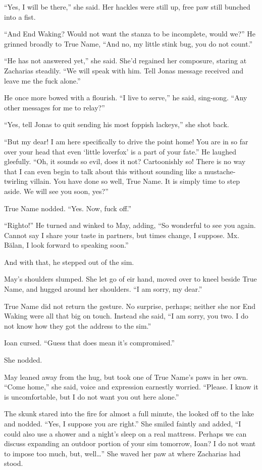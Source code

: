 ``Yes, I will be there,'' she said. Her hackles were still up, free paw still bunched into a fist.

``And End Waking? Would not want the stanza to be incomplete, would we?'' He grinned broadly to True Name, ``And no, my little stink bug, you do not count.''

``He has not answered yet,'' she said. She'd regained her composure, staring at Zacharias steadily. ``We will speak with him. Tell Jonas message received and leave me the fuck alone.''

He once more bowed with a flourish. ``I live to serve,'' he said, sing-song. ``Any other messages for me to relay?''

``Yes, tell Jonas to quit sending his most foppish lackeys,'' she shot back.

``But my dear! I am here specifically to drive the point home! You are in so far over your head that even `little loverfox' is a part of your fate.'' He laughed gleefully. ``Oh, it sounds so evil, does it not? Cartoonishly so! There is no way that I can even begin to talk about this without sounding like a mustache-twirling villain. You have done so well, True Name. It is simply time to step aside. We will see you soon, yes?''

True Name nodded. ``Yes. Now, fuck off.''

``Righto!'' He turned and winked to May, adding, ``So wonderful to see you again. Cannot say I share your taste in partners, but times change, I suppose. Mx. Bălan, I look forward to speaking soon.''

And with that, he stepped out of the sim.

May's shoulders slumped. She let go of eir hand, moved over to kneel beside True Name, and hugged around her shoulders. ``I am sorry, my dear.''

True Name did not return the gesture. No surprise, perhaps; neither she nor End Waking were all that big on touch. Instead she said, ``I am sorry, you two. I do not know how they got the address to the sim.''

Ioan cursed. ``Guess that does mean it's compromised.''

She nodded.

May leaned away from the hug, but took one of True Name's paws in her own. ``Come home,'' she said, voice and expression earnestly worried. ``Please. I know it is uncomfortable, but I do not want you out here alone.''

The skunk stared into the fire for almost a full minute, the looked off to the lake and nodded. ``Yes, I suppose you are right.'' She smiled faintly and added, ``I could also use a shower and a night's sleep on a real mattress. Perhaps we can discuss expanding an outdoor portion of your sim tomorrow, Ioan? I do not want to impose too much, but, well\ldots{}'' She waved her paw at where Zacharias had stood.

